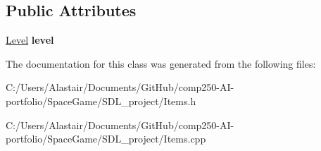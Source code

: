 \subsection*{Public Attributes}
\begin{DoxyCompactItemize}
\item 
\mbox{\label{class_items_aabd80c6842ce11419edd5830d6e86e26}} 
\hyperlink{class_level}{Level} {\bfseries level}
\end{DoxyCompactItemize}


The documentation for this class was generated from the following files\+:\begin{DoxyCompactItemize}
\item 
C\+:/\+Users/\+Alastair/\+Documents/\+Git\+Hub/comp250-\/\+A\+I-\/portfolio/\+Space\+Game/\+S\+D\+L\+\_\+project/Items.\+h\item 
C\+:/\+Users/\+Alastair/\+Documents/\+Git\+Hub/comp250-\/\+A\+I-\/portfolio/\+Space\+Game/\+S\+D\+L\+\_\+project/Items.\+cpp\end{DoxyCompactItemize}
